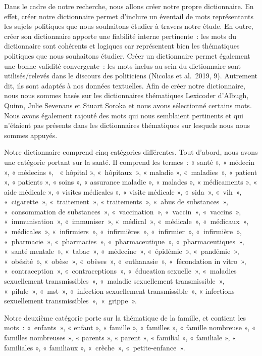 \documentclass[
  letterpaper,
  DIV=11,
  numbers=noendperiod]{scrartcl}
\begin{document}
Dans le cadre de notre recherche, nous allons créer notre propre
dictionnaire. En effet, créer notre dictionnaire permet d'inclure un
éventail de mots représentants les sujets politiques que nous souhaitons
étudier à travers notre étude. En outre, créer son dictionnaire apporte
une fiabilité interne pertinente~: les mots du dictionnaire sont
cohérents et logiques car représentent bien les thématiques politiques
que nous souhaitons étudier. Créer un dictionnaire permet également une
bonne validité convergente~: les mots inclus au sein du dictionnaire
sont utilisés/relevés dans le discours des politiciens (Nicolas et
al.~2019, 9). Autrement dit, ils sont adaptés à nos données textuelles.
Afin de créer notre dictionnaire, nous nous sommes basés sur les
dictionnaires thématiques Lexicoder d'Albugh, Quinn, Julie Sevenans et
Stuart Soroka et nous avons sélectionné certains mots. Nous avons
également rajouté des mots qui nous semblaient pertinents et qui
n'étaient pas présents dans les dictionnaires thématiques sur lesquels
nous nous sommes appuyés.

Notre dictionnaire comprend cinq catégories différentes. Tout d'abord,
nous avons une catégorie portant sur la santé. Il comprend les termes~:
« santé », « médecin », « médecins », ~« hôpital », «~hôpitaux~», «
maladie », «~maladies~», « patient », « patients », « soins », «
assurance maladie », « malades », « médicaments », « aide médicale », «
visites médicales », « visite médicale », «~sida~», «~vih~»,
«~cigarette~», «~traitement~», « traitements~», «~abus de substances~»,
«~consommation de substances~», «~vaccination~», «~vaccin~»,
«~vaccins~», «~immunisation~», «~immuniser~», «~médical~», «~médicale~»,
«~médicaux~», «~médicales~», «~infirmiers~», «~infirmières~»,
«~infirmier~», «~infirmière~», «~pharmacie~», «~pharmacies~»,
«~pharmaceutique~», «~pharmaceutiques~», «~santé mentale~», «~tabac~»,
«~médecine~», «~épidémie~», «~pandémie~», «~obésité~», «~obèse~»,
«~obèses~», «~euthanasie~», «~fécondation in vitro~», «~contraception~»,
«~contraceptions~», «~éducation sexuelle~», «~maladies sexuellement
transmissibles~», «~maladie sexuellement transmissible~», «~pilule~»,
«~mst~», «~infection sexuellement transmissible~», « infections
sexuellement transmissibles~»,~«~grippe~».

Notre deuxième catégorie porte sur la thématique de la famille, et
contient les mots~: «~enfants~», « enfant », « famille », « familles »,
« famille nombreuse », « familles nombreuses », « parents », « parent »,
« familial », « familiale », « familiales », « familiaux », «~crèche~»,
«~petite-enfance~».
\end{document}
